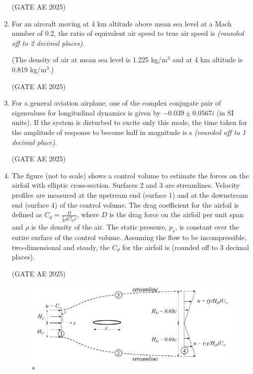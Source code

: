 \documentclass[journal,12pt,onecolumn]{IEEEtran}
\theoremstyle{remark}
\begin{document}
\begin{flushleft}
\begin{enumerate}
\hfill (GATE AE 2025)

\item For an aircraft moving at 4 km altitude above mean sea level at a Mach number of 0.2, the ratio of equivalent air speed to true air speed is \underline{\hspace{3cm}} \textit{(rounded off to 2 decimal places)}.  

(The density of air at mean sea level is 1.225 kg/m$^3$ and at 4 km altitude is 0.819 kg/m$^3$.)

\hfill (GATE AE 2025)

\item For a general aviation airplane, one of the complex conjugate pair of eigenvalues for longitudinal dynamics is given by $-0.039 \pm 0.0567 i$ (in SI units). If the system is disturbed to excite only this mode, the time taken for the amplitude of response to become half in magnitude is \underline{\hspace{3cm}} s \textit{(rounded off to 1 decimal place)}.

\hfill (GATE AE 2025)

\item The figure (not to scale) shows a control volume to estimate the forces on the airfoil with elliptic cross-section. Surfaces 2 and 3 are streamlines. Velocity profiles are measured at the upstream end (surface 1) and at the downstream end (surface 4) of the control volume. The drag coefficient for the airfoil is defined as
$C_d = \frac{D}{\frac12 \rho U_\infty^2 c}$,
where $D$ is the drag force on the airfoil per unit span and $\rho$ is the density of the air. The static pressure, $p_s$, is constant over the entire surface of the control volume. Assuming the flow to be incompressible, two-dimensional and steady, the $C_d$ for the airfoil is \underline{\hspace{3cm}} (rounded off to 3 decimal places). 

\hfill (GATE AE 2025)

\begin{figure}[H]
\includegraphics[width=0.8\columnwidth]{figs/63.png}
\caption{*}
    \label{fig:placeholder}
\end{figure}


\end{enumerate}
\end{flushleft}
\end{document}
